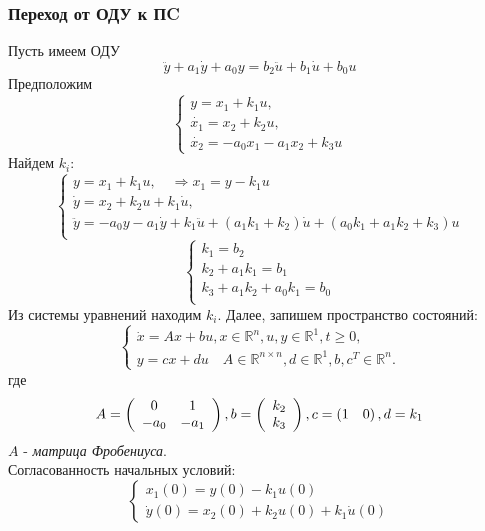 \documentclass[A4]{article}
\begin{document}
\subsubsection{Переход от ОДУ к ПC}
Пусть имеем ОДУ
\begin{equation}
\ddot{y}+a_1\dot{y}+a_0y=b_2\ddot{u}+b_1\dot{u}+b_0u
\end{equation}
Предположим
\begin{equation}
\left\{\begin{array}{cc}
y=x_1+k_1u,\\
\dot{x_1}=x_2+k_2u,\\
\dot{x_2}=-a_0x_1-a_1x_2+k_3u
\end{array}\right.
\end{equation}
Найдем $k_i$:
\begin{equation}
\left\{\begin{array}{cc}
y=x_1+k_1u,\quad\Rightarrow x_1=y-k_1u\\
\dot{y}=x_2+k_2u+k_1\dot{u},\\
\ddot{y}=-a_0y-a_1\dot{y}+k_1\ddot{u}+(a_1k_1+k_2)\dot{u}+(a_0k_1+a_1k_2+k_3)u\\
\end{array}\right.
\end{equation}
\begin{equation}
\left\{\begin{array}{cc}
k_1=b_2\\
k_2+a_1k_1=b_1\\
k_3+a_1k_2+a_0k_1=b_0\\
\end{array}\right.
\end{equation}
Из системы уравнений находим $k_i$. Далее, запишем пространство состояний:
\begin{equation}
\left\{\begin{array}{cc}
\dot{x}=Ax+bu,x\in \mathbb{R}^n,u,y\in\mathbb{R}^1,t\ge 0,\\
y=cx+du\quad A\in \mathbb{R}^{n\times n},d\in\mathbb{R}^1,b,c^T\in\mathbb{R}^n.
\end{array}\right.
\end{equation}
где
\begin{equation*}
A=\left(\begin{array}{cc}
0 &1\\
-a_0& -a_1\\
\end{array}\right),b=\left(\begin{array}{c}k_2\\k_3\end{array}\right),\\c=\left(1\quad 0\right),d=k_1
\end{equation*}
$A$ - \emph{матрица Фробениуса}.\\
Согласованность начальных условий:
\begin{equation}
\left\{\begin{array}{cc}
x_1(0)=y(0)-k_1u(0)\\
\dot{y}(0)=x_2(0)+k_2u(0)+k_1\dot{u}(0)
\end{array}\right.
\end{equation}
\end{document}
